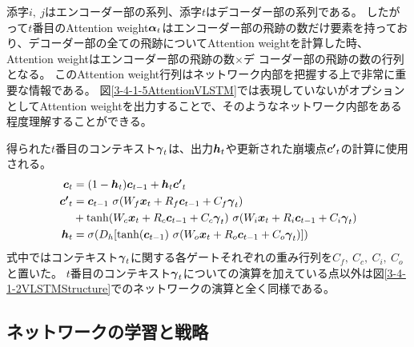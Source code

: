 添字$i,\ j$はエンコーダー部の系列、添字$t$はデコーダー部の系列である。
したがって$t$番目のAttention weight${\mbox{\boldmath{$\alpha$}}}_{t}$はエンコーダー部の飛跡の数だけ要素を持っており、デコーダー部の全ての飛跡についてAttention weightを計算した時、Attention weightはエンコーダー部の飛跡の数$\times$デ
コーダー部の飛跡の数の行列となる。
このAttention weight行列はネットワーク内部を把握する上で非常に重要な情報である。
図\ref{3-4-1-5AttentionVLSTM}では表現していないがオプションとしてAttention weightを出力することで、そのようなネットワーク内部をある程度理解することができる。

得られた$t$番目のコンテキスト${\mbox{\boldmath{$\gamma$}}}_{t}$は、出力${\mbox{\boldmath{$h$}}}_{t}$や更新された崩壊点${\mbox{\boldmath{$c'$}}}_{t}$の計算に使用される。
\begin{equation}
 \begin{split}
  {\mbox{\boldmath{$c$}}}_{t} 
  &= (1-{\mbox{\boldmath{$h$}}}_t) {\mbox{\boldmath{$c$}}}_{t-1} + {\mbox{\boldmath{$h$}}}_t {\mbox{\boldmath{$c'$}}}_{t}\\
  {\mbox{\boldmath{$c'$}}}_{t}
  &= {\mbox{\boldmath{$c$}}}_{t-1} \  \sigma (W_f {\mbox{\boldmath{$x$}}}_t + R_f {\mbox{\boldmath{$c$}}}_{t-1} + C_f {\mbox{\boldmath{$\gamma$}}}_{t})\\
  &+ \tanh (W_c {\mbox{\boldmath{$x$}}}_t + R_c {\mbox{\boldmath{$c$}}}_{t-1} + C_c {\mbox{\boldmath{$\gamma$}}}_{t}) \  \sigma (W_i {\mbox{\boldmath{$x$}}}_t + R_i {\mbox{\boldmath{$c$}}}_{t-1} + C_i {\mbox{\boldmath{$\gamma$}}}_{t})\\
  {\mbox{\boldmath{$h$}}}_{t} 
  &= \sigma (D_h [\tanh({\mbox{\boldmath{$c$}}}_{t-1}) \  \sigma (W_o {\mbox{\boldmath{$x$}}}_t + R_o {\mbox{\boldmath{$c$}}}_{t-1} + C_o {\mbox{\boldmath{$\gamma$}}}_{t}) ])
 \end{split}
\end{equation}
式中ではコンテキスト${\mbox{\boldmath{$\gamma$}}}_{t}$に関する各ゲートそれぞれの重み行列を$C_f,\ C_c,\ C_i,\ C_o$と置いた。
$t$番目のコンテキスト${\mbox{\boldmath{$\gamma$}}}_{t}$についての演算を加えている点以外は図\ref{3-4-1-2VLSTMStructure}でのネットワークの演算と全く同様である。


\subsection{ネットワークの学習と戦略} \label{Net:VLSTM:TrainingandStrategyofVLSTM}

